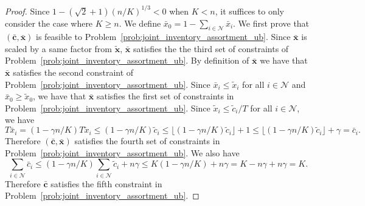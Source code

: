 \documentclass[mnsc,non-blindrev]{informs3}
\theoremstyle{definition}
\begin{document}
\begin{appendices}{\Large{}}
{\begin{proof}
Since $1-(\sqrt{2}+1)(n/K)^{1/3}<0$ when $K<n$, it suffices to only consider the case where $K\geq n$. We define $\bar{x}_0=1-\sum_{i\in\mathcal{N}}\bar{x}_i$. We first prove that $(\bar{\bm{c}},\bar{\bm{x}})$ is feasible to Problem~\eqref{prob:joint_inventory_assortment_ub}. Since $\bar{\bm{x}}$ is scaled by a same factor from $\tilde{\bm{x}}$, $\bar{\bm{x}}$ satisfies the the third set of constraints of Problem~\eqref{prob:joint_inventory_assortment_ub}. By definition of $\bar{\bm{x}}$ we have that $\bar{\bm{x}}$ satisfies the second constraint of Problem~\eqref{prob:joint_inventory_assortment_ub}. Since $\bar{x}_i\leq \tilde{x}_i$ for all $i\in\mathcal{N}$ and $\bar{x}_0\geq \tilde{x}_0$, we have that $\bar{\bm{x}}$ satisfies the first set of constraints in Problem~\eqref{prob:joint_inventory_assortment_ub}. Since $\tilde{x}_i\leq \tilde{c}_i/T$ for all $i\in\mathcal{N}$, we have
\begin{equation*}
T\bar{x}_i=(1-\gamma n/K)T\tilde{x}_i\leq (1-\gamma n/K)\tilde{c}_i\leq \lfloor(1-\gamma n/K)\tilde{c}_i\rfloor+1\leq \lfloor(1-\gamma n/K)\tilde{c}_i\rfloor+\gamma=\bar{c}_i.
\end{equation*}
Therefore $(\bar{\bm{c}},\bar{\bm{x}})$ satisfies the fourth set of constraints in Problem~\eqref{prob:joint_inventory_assortment_ub}. We also have
\begin{equation*}
\sum_{i\in\mathcal{N}}\bar{c}_i\leq (1-\gamma n/K)\sum_{i\in\mathcal{N}}\tilde{c}_i+n\gamma\leq K(1-\gamma n/K)+n\gamma=K-n\gamma+n\gamma=K.
\end{equation*}
Therefore $\bar{\bm{c}}$ satisfies the fifth constraint in Problem~\eqref{prob:joint_inventory_assortment_ub}.


\end{proof}}
\end{appendices}
\end{document}

